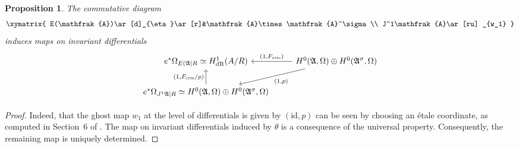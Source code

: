 \documentclass[11pt]{amsart}
\newcommand{\dR}{\mathrm{dR}}
\newcommand{\Lie}{\mathrm{Lie}}
\theoremstyle{plain}
\newtheorem{proposition}{Proposition}
\theoremstyle{definition}
\newcommand{\cris}{\mathrm{cris}}
\newcommand{\netan}[1]{{\color{blue} \sf $\clubsuit\clubsuit\clubsuit$ Netan: [#1]}}
\newcommand{\sudip}[1]{{\color{purple} \sf $\clubsuit\clubsuit\clubsuit$ Sudip: [#1]}}
\begin{document}
\begin{proposition}\label{prop:doesnt_exist_yet}
The commutative diagram
\[
\xymatrix{
E(\mathfrak{A})\ar[d]_{\eta}\ar[r]&\mathfrak{A}\times \mathfrak{A}^\sigma \\
J^1\mathfrak{A}\ar[ru] _{w_1}
}
\]
induces maps on invariant differentials
\[
\begin{tikzcd}
e^* \Omega _{E(\mathfrak{A}|R} \simeq H^1 _{\dR}(A/R) & H^0 (\mathfrak{A},\Omega )\oplus H^0 (\mathfrak{A}^{\sigma },\Omega ) \arrow[l, "{(1,F_{\cris })}"'] \arrow[ld, "{(1,p)}"] \\
e^* \Omega _{J^1 \mathfrak{A}|R}\simeq  H^0 (\mathfrak{A},\Omega ) \oplus H^0 (\mathfrak{A}^{\sigma },\Omega ) \arrow[u, "{(1,F_{\cris }/p)}"] &
\end{tikzcd}
\]
\end{proposition}
\begin{proof}
Indeed, that the ghost map $w_1$ at the level of differentials is given by $(\mathrm{id}, p)$ can be seen by choosing an {\'e}tale coordinate, as computed in Section~6 of \cite{BS}. The map on invariant differentials induced by $\theta $ is a consequence of the universal property. Consequently, the remaining map is uniquely determined. %
\end{proof}
\end{document}
